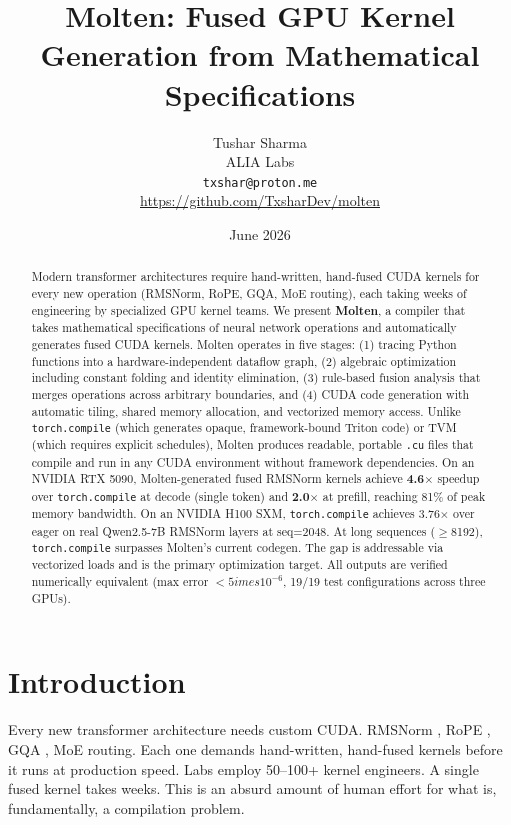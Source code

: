 \documentclass[11pt,a4paper]{article}
\title{Molten: Fused GPU Kernel Generation from Mathematical Specifications}
\author{
  Tushar Sharma \\
  ALIA Labs \\
  \texttt{txshar@proton.me} \\
  \url{https://github.com/TxsharDev/molten}
}
\date{June 2026}
\begin{document}
\maketitle

\begin{abstract}
Modern transformer architectures require hand-written, hand-fused CUDA kernels
for every new operation (RMSNorm, RoPE, GQA, MoE routing), each taking weeks
of engineering by specialized GPU kernel teams. We present \textbf{Molten}, a
compiler that takes mathematical specifications of neural network operations
and automatically generates fused CUDA kernels. Molten operates in five stages:
(1) tracing Python functions into a hardware-independent dataflow graph,
(2) algebraic optimization including constant folding and identity elimination,
(3) rule-based fusion analysis that merges operations across arbitrary boundaries,
and (4) CUDA code generation with automatic tiling, shared memory allocation,
and vectorized memory access. Unlike \texttt{torch.compile} (which generates
opaque, framework-bound Triton code) or TVM (which requires explicit schedules),
Molten produces readable, portable \texttt{.cu} files that compile and run in
any CUDA environment without framework dependencies. On an NVIDIA RTX 5090,
Molten-generated fused RMSNorm kernels achieve \textbf{4.6$\times$} speedup over
\texttt{torch.compile} at decode (single token) and \textbf{2.0$\times$} at
prefill, reaching 81\% of peak memory bandwidth. On an NVIDIA H100 SXM,
\texttt{torch.compile} achieves 3.76$\times$ over eager on real Qwen2.5-7B
RMSNorm layers at seq=2048. At long sequences ($\geq$8192), \texttt{torch.compile}
surpasses Molten's current codegen. The gap is addressable via vectorized loads
and is the primary optimization target. All outputs are verified numerically
equivalent (max error $< 5 	imes 10^{-6}$, 19/19 test configurations across three GPUs).
\end{abstract}

\section{Introduction}

Every new transformer architecture needs custom CUDA.
RMSNorm \cite{zhang2019rmsnorm}, RoPE \cite{su2021roformer},
GQA \cite{ainslie2023gqa}, MoE routing. Each one demands hand-written,
hand-fused kernels before it runs at production speed. Labs employ 50--100+
kernel engineers. A single fused kernel takes weeks. This is an absurd
amount of human effort for what is, fundamentally, a compilation problem.
\end{document}
